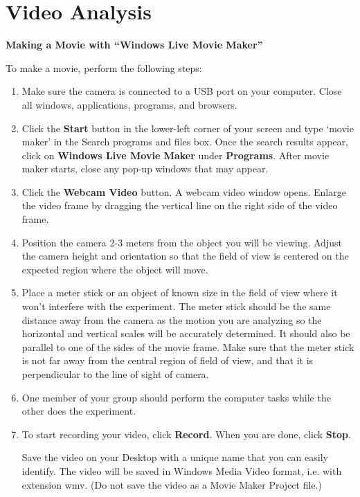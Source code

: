 
\section{Video Analysis}

\textbf{Making a Movie with ``Windows Live Movie Maker''} 

To make a movie, perform the following steps:

\begin{enumerate}

\item Make sure the camera is connected to a USB port on your computer. 
Close all windows, applications, programs, and browsers.

\item Click the {\bf Start} button in the lower-left corner of your screen and type `movie maker' 
in the Search programs and files box. 
Once the search results appear, click on {\bf Windows Live Movie Maker} under {\bf Programs}. 
After movie maker starts, close any pop-up windows that may appear.

\item Click the {\bf Webcam Video} button. 
A webcam video window opens. 
Enlarge the video frame by dragging the vertical line on the right side of the video frame.

\item Position the camera 2-3 meters from the object you will be viewing. 
Adjust the camera height and orientation so that the field of view is 
centered on the expected region where the object will move. 

\item Place a meter stick or an object of known size in the field of view where 
it won't interfere with the experiment. 
The meter stick should be the same distance away from the camera as the motion 
you are analyzing so the horizontal and vertical scales will be accurately determined. 
It should also be parallel to one of the sides of the movie frame. 
Make sure that the meter stick is not far away from the central region of field of view, and 
that it is perpendicular to the line of sight of camera.

\item One member of your group should perform the computer tasks while the other does the experiment.

\item To start recording your video, click {\bf Record}. When you are done, click {\bf Stop}. 

Save the video on your Desktop with a unique name that you can easily identify.
 The video will be saved in Windows Media Video format, i.e. with extension wmv. 
(Do not save the video as a Movie Maker Project file.)

\end{enumerate}

